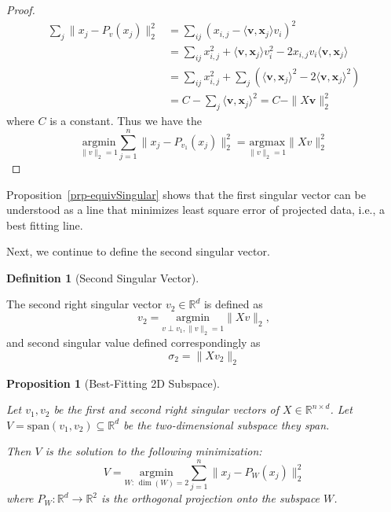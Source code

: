 \documentclass[
  letterpaper,
  DIV=11,
  numbers=noendperiod]{scrreprt}
\theoremstyle{definition}
\newtheorem{definition}{Definition}[chapter]
\theoremstyle{plain}
\theoremstyle{plain}
\newtheorem{proposition}{Proposition}[chapter]
\theoremstyle{definition}
\theoremstyle{plain}
\theoremstyle{plain}
\theoremstyle{remark}
\begin{document}
\begin{proof}
\[
\begin{align}
\sum_{j} \|x_j - P_{v}(x_j)\|_2^2 &= \sum_{ij}\left(x_{i,j}-\langle\mathbf{v}, \mathbf{x}_j\rangle v_i\right)^2 \\
&=\sum_{ij}x^2_{i, j} + \langle\mathbf{v}, \mathbf{x}_j\rangle v_i^2 - 2x_{i,j}v_i\langle\mathbf{v}, \mathbf{x}_j \rangle\\
&=\sum_{ij}x^2_{i,j} + \sum_j\left(\langle\mathbf{v},\mathbf{x}_j\rangle ^2 -2\langle\mathbf{v},\mathbf{x}_j\rangle^2\right)\\
&=C - \sum_j\langle\mathbf{v},\mathbf{x}_j\rangle^2=C-\|X\mathbf{v}\|^2_2
\end{align}
\] where \(C\) is a constant. Thus we have the \[
\underset{\|v\|_2=1}{\mathrm{argmin}} \sum_{j=1}^{n} \|x_j - P_{v_1}(x_j)\|_2^2 = \underset{\|v\|_2=1}{\mathrm{argmax}} \|Xv\|_2^2
\]
\end{proof}

\begin{tcolorbox}[enhanced jigsaw, bottomrule=.15mm, title=\textcolor{quarto-callout-note-color}{\faInfo}\hspace{0.5em}{Note}, left=2mm, colback=white, toprule=.15mm, bottomtitle=1mm, titlerule=0mm, leftrule=.75mm, colbacktitle=quarto-callout-note-color!10!white, opacitybacktitle=0.6, coltitle=black, colframe=quarto-callout-note-color-frame, rightrule=.15mm, breakable, toptitle=1mm, arc=.35mm, opacityback=0]

Proposition~\ref{prp-equivSingular} shows that the first singular vector
can be understood as a line that minimizes least square error of
projected data, i.e., a best fitting line.

\end{tcolorbox}

Next, we continue to define the second singular vector.

\begin{definition}[Second Singular
Vector]\protect\hypertarget{def-2ndSingularVec}{}\label{def-2ndSingularVec}

The second right singular vector \(v_2 \in \mathbb{R}^d\) is defined as
\[
v_2 = \underset{{v \perp v_1, \|v\|_2=1}}{\mathrm{argmin}} \|Xv\|_2,
\] and second singular value defined correspondingly as \[
\sigma_2 = \|Xv_2\|_2
\]

\end{definition}

\begin{proposition}[Best-Fitting 2D
Subspace]\protect\hypertarget{prp-best2dSubspace}{}\label{prp-best2dSubspace}

Let \(v_1, v_2\) be the first and second right singular vectors of
\(X \in \mathbb{R}^{n \times d}\). Let
\(V = \text{span}(v_1, v_2) \subseteq \mathbb{R}^d\) be the
two-dimensional subspace they span.

Then \(V\) is the solution to the following minimization: \[
V = \underset{W:\,\dim(W)=2}{\mathrm{argmin}} \sum_{j=1}^{n} \|x_j - P_W(x_j)\|_2^2
\] where \(P_W:\mathbb{R}^d\rightarrow\mathbb{R}^2\) is the orthogonal
projection onto the subspace \(W\).

\end{proposition}
\end{document}
